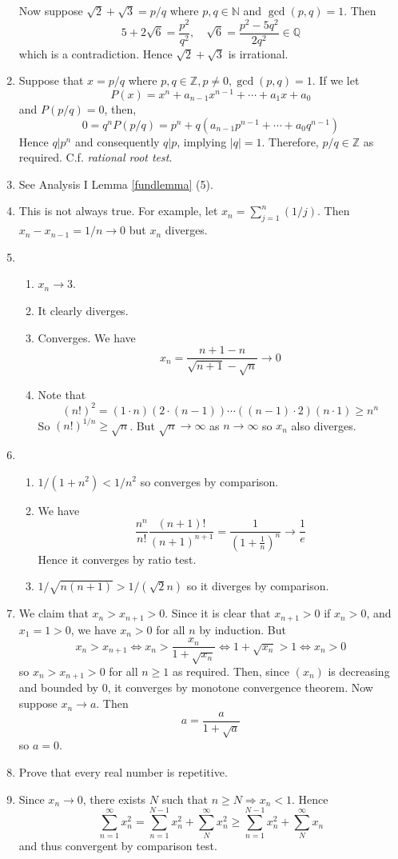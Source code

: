 \documentclass[10pt, a4paper, twoside]{report}
\begin{document}
\begin{enumerate}[{1.}]
    Now suppose \(\sqrt{2}+\sqrt{3}=p/q\) where \(p,q\in\mathbb{N}\) and \(\gcd(p,q)=1\). Then 
    \[5+2\sqrt{6}=\frac{p^2}{q^2},\quad\sqrt{6}=\frac{p^2-5q^2}{2q^2}\in\mathbb{Q}\]
    which is a contradiction. Hence \(\sqrt{2}+\sqrt{3}\) is irrational.
    \item Suppose that \(x=p/q\) where \(p,q\in\mathbb{Z},p\neq 0,\gcd(p,q)=1\). If we let 
    \[P(x)=x^n+a_{n-1}x^{n-1}+\cdots+a_1x+a_0\]
    and \(P(p/q)=0\), then,
    \[0=q^nP(p/q)=p^n+q(a_{n-1}p^{n-1}+\cdots+a_0q^{n-1})\]
    Hence \(q|p^n\) and consequently \(q|p\), implying \(|q|=1\). Therefore, \(p/q\in\mathbb{Z}\) as required. C.f. \emph{rational root test}.
    \item See Analysis I Lemma \ref{fundlemma} (5).
    \item This is not always true. For example, let \(x_n=\sum_{j=1}^n(1/j)\). Then \(x_n-x_{n-1}=1/n\to 0\) but \(x_n\) diverges.
    \item \begin{enumerate}[{(i)}]
        \item \(x_n\to 3\).
        \item It clearly diverges.
        \item Converges. We have 
        \[x_n=\frac{n+1-n}{\sqrt{n+1}-\sqrt{n}}\to 0\]
        \item Note that 
        \[(n!)^2=(1\cdot n)(2\cdot(n-1))\cdots((n-1)\cdot 2)(n\cdot 1)\geq n^n\]
        So \((n!)^{1/n}\geq\sqrt{n}\). But \(\sqrt{n}\to\infty\) as \(n\to\infty\) so \(x_n\) also diverges.
    \end{enumerate}
    \item \begin{enumerate}[{(i)}]
        \item \(1/(1+n^2)<1/n^2\) so converges by comparison.
        \item We have
        \[\frac{n^n}{n!}\frac{(n+1)!}{(n+1)^{n+1}}=\frac{1}{\left(1+\frac 1n\right)^n}\to\frac 1e\]
        Hence it converges by ratio test.
        \item \(1/\sqrt{n(n+1)}>1/(\sqrt{2}n)\) so it diverges by comparison.
    \end{enumerate}
    \item We claim that \(x_n>x_{n+1}>0\). Since it is clear that \(x_{n+1}>0\) if \(x_n>0\), and \(x_1=1>0\), we have \(x_n>0\) for all \(n\) by induction. But 
    \[x_n>x_{n+1}\Leftrightarrow x_n>\frac{x_n}{1+\sqrt{x_n}}\Leftrightarrow 1+\sqrt{x_n}>1\Leftrightarrow x_n>0\]
    so \(x_n>x_{n+1}>0\) for all \(n\geq 1\) as required. Then, since \((x_n)\) is decreasing and bounded by \(0\), it converges by monotone convergence theorem. Now suppose \(x_n\to a\). Then 
    \[a=\frac{a}{1+\sqrt{a}}\]
    so \(a=0\).
    \item Prove that every real number is repetitive.
    \item Since \(x_n\to 0\), there exists \(N\) such that \(n\geq N\Rightarrow x_n<1\). Hence 
    \[\sum_{n=1}^\infty x_n^2=\sum_{n=1}^{N-1}x_n^2+\sum_{N}^{\infty}x_n^2\geq\sum_{n=1}^{N-1}x_n^2+\sum_{N}^\infty x_n\]
    and thus convergent by comparison test.


\end{enumerate}
\end{document}
